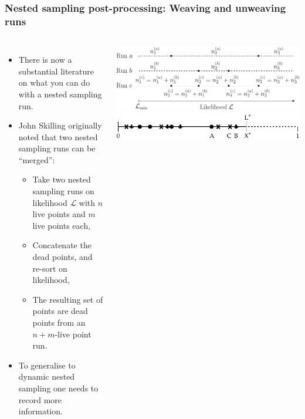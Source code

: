 \documentclass[aspectratio=169]{beamer}
\begin{document}
\begin{frame}
    \frametitle{Nested sampling post-processing: Weaving and unweaving runs}
    \begin{columns}
        \begin{itemize}
            \item There is now a substantial literature on what you can do with a nested sampling run.
            \item John Skilling originally noted that two nested sampling runs can be ``merged'':
                \begin{itemize}
                    \item Take two nested sampling runs on likelihood $\mathcal{L}$ with $n$ live points and $m$ live points each,
                    \item Concatenate the dead points, and re-sort on likelihood,
                    \item The resulting set of points are dead points from an $n+m$-live point run.
                \end{itemize}
            \item To generalise to dynamic nested sampling one needs to record more information.
        \end{itemize}
        \includegraphics[width=0.8\textheight,angle=270]{figures/combine}
        \hfill
        \includegraphics[width=0.8\textheight,angle=270]{figures/combine_0}
    \end{columns}
\end{frame}
\end{document}
